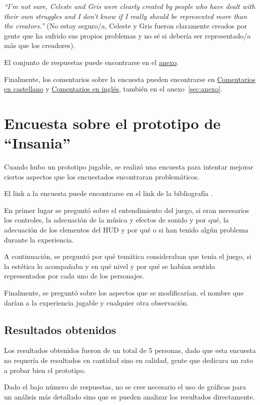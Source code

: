\documentclass[12pt, a4paper,twoside,titlepage]{book}
\begin{document}
\textit{``I'm not sure, Celeste and Gris were clearly created by people who have dealt with their own struggles and I don't know if I really should be represented more than the creators.''} (No estoy seguro/a, Celeste y Gris fueron claramente creados por gente que ha sufrido sus propios problemas y no sé si debería ser representado/a más que los creadores). 

El conjunto de respuestas puede encontrarse en el \hyperref[representacionIngles]{anexo}.

Finalmente, los comentarios sobre la encuesta pueden encontrarse en \hyperref[comentariosCastellano]{Comentarios en castellano} y \hyperref[comentariosIngles]{Comentarios en inglés}, también en el anexo~\ref{sec:anexo}. 




\section{Encuesta sobre el prototipo de ``Insania''}
\label{sec:encuestaDemo}
Cuando hubo un prototipo jugable, se realizó una encuesta para intentar mejorar ciertos aspectos que los encuestados encontraran problemáticos. 

El link a la encuesta puede encontrarse en el link de la bibliografía . 

En primer lugar se preguntó sobre el entendimiento del juego, si eran necesarios los controles, la adecuación de la música y efectos de sonido y por qué, la adecuación de los elementos del HUD y por qué o si han tenido algún problema durante la experiencia. 

A continuación, se preguntó por qué temática consideraban que tenía el juego, si la estética lo acompañaba y en qué nivel y por qué se habían sentido representados por cada uno de los personajes. 

Finalmente, se preguntó sobre los aspectos que se modificarían, el nombre que darían a la experiencia jugable y cualquier otra observación. 


\subsection{Resultados obtenidos}

Los resultados obtenidos fueron de un total de 5 personas, dado que esta encuesta no requería de resultados en cantidad sino en calidad, gente que dedicara un rato a probar bien el prototipo. 

Dado el bajo número de respuestas, no se cree necesario el uso de gráficas para un análisis más detallado sino que se pueden analizar los resultados directamente. 
\end{document}
